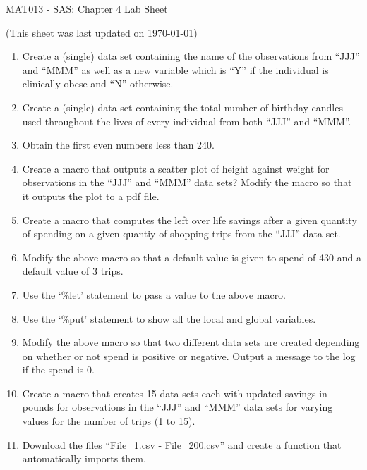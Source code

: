 \documentclass[12pt]{article}
\begin{document}
\begin{center}
\huge{MAT013 - SAS: Chapter 4 Lab Sheet}\\
\begin{center}
\tiny{(This sheet was last updated on \today)}
\end{center}
\end{center}

\begin{enumerate}
\item Create a (single) data set containing the name of the observations from ``JJJ'' and ``MMM'' as well as a new variable which is ``Y'' if the individual is clinically obese and ``N'' otherwise.
\item Create a (single) data set containing the total number of birthday candles used throughout the lives of every individual from both ``JJJ'' and ``MMM''.
\item Obtain the first even numbers less than 240.
\item Create a macro that outputs a scatter plot of height against weight for observations in the ``JJJ''  and ``MMM'' data sets? Modify the macro so that it outputs the plot to a pdf file.
\item Create a macro that computes the left over life savings after a given quantity of spending on a given quantiy of shopping trips from the ``JJJ'' data set.
\item Modify the above macro so that a default value is given to spend of 430 and a default value of 3 trips.
\item Use the `\%let' statement to pass a value to the above macro.
\item Use the `\%put' statement to show all the local and global variables.
\item Modify the above macro so that two different data sets are created depending on whether or not spend is positive or negative. Output a message to the log if the spend is 0.
\item Create a macro that creates 15 data sets each with updated savings in pounds for observations in the ``JJJ'' and ``MMM'' data sets for varying values for the number of trips (1 to 15).
\item Download the files \href{https://docs.google.com/file/d/0Bx_zrw5uAafbc3B1WndVdk1FM1E/edit}{``File\_1.csv - File\_200.csv''} and create a function that automatically imports them.
\end{enumerate}
\end{document}
